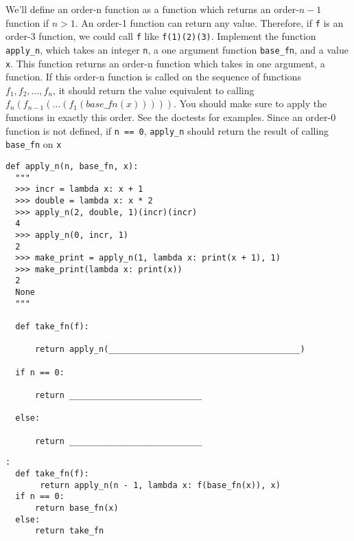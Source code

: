 \begin{blocksection}
\question
We'll define an order-n function as a function which returns an order-$n-1$ function if $n > 1$. An order-1 function can return any value.
\newline
\newline
Therefore, if \texttt{f} is an order-3 function, we could call \texttt{f} like \lstinline{f(1)(2)(3)}.
\newline
\newline
Implement the function \texttt{apply\_n}, which takes an integer \texttt{n}, a one argument function \texttt{base\_fn},
and a value \texttt{x}. This function returns an order-n function which takes in one argument, a function. If this order-n function is called on the sequence of functions $f_1, f_2, \ldots, f_n$, it should return the value equivalent to calling
$f_n(f_{n - 1}(\ldots (f_1(base\_fn(x)))))$. You should make sure to apply the functions in exactly this order. See the doctests for examples.
\newline
\newline
Since an order-0 function is not defined, if \texttt{n == 0}, \texttt{apply\_n} should return the result of calling
\texttt{base\_fn} on \texttt{x}
\newline
\begin{lstlisting}
def apply_n(n, base_fn, x):
  """
  >>> incr = lambda x: x + 1
  >>> double = lambda x: x * 2
  >>> apply_n(2, double, 1)(incr)(incr)
  4
  >>> apply_n(0, incr, 1)
  2
  >>> make_print = apply_n(1, lambda x: print(x + 1), 1)
  >>> make_print(lambda x: print(x))
  2
  None
  """

  def take_fn(f):

      return apply_n(_______________________________________)

  if n == 0:

      return ___________________________

  else:

      return ___________________________
\end{lstlisting}
\end{blocksection}
\begin{blocksection}

\begin{solution}[0in]
\begin{lstlisting}:
  def take_fn(f):
       return apply_n(n - 1, lambda x: f(base_fn(x)), x)
  if n == 0:
      return base_fn(x)
  else:
      return take_fn
\end{lstlisting}
\end{solution}
\end{blocksection}
